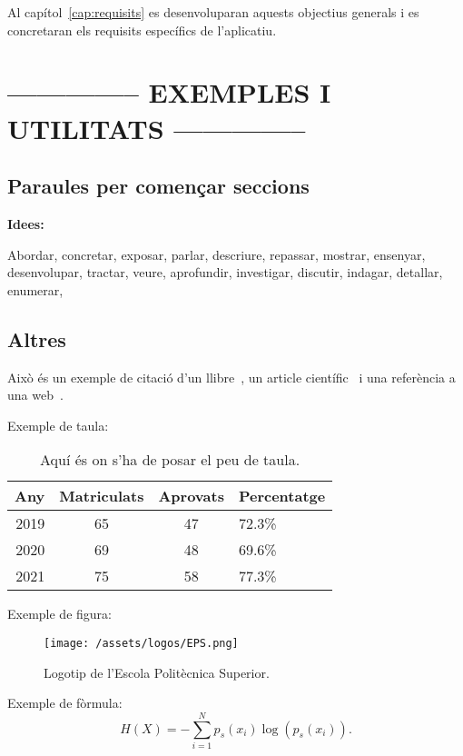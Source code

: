 \documentclass[a4paper,12pt]{ThesisStyle}
\begin{document}
Al capítol~\ref{cap:requisits} es desenvoluparan aquests objectius generals i es concretaran els requisits específics de l'aplicatiu.


\section{-------------- EXEMPLES I UTILITATS --------------}
\subsection{Paraules per començar seccions}
\textbf{Idees:}

Abordar, concretar, exposar, parlar, descriure, repassar, mostrar, ensenyar, desenvolupar, tractar, veure, aprofundir, investigar, discutir, indagar, detallar,
enumerar,


\subsection{Altres}

Això és un exemple de citació d'un llibre~\cite{Coleman1974}, un article científic~\cite{Ruiz2008} i una referència a una web~\cite{Halcon}.

Exemple de taula:
\begin{table}[htb]
\centering
\begin{tabular}{ | r | c | c | l | }
 \hline
  Any & Matriculats & Aprovats & Percentatge\\
\hline
 2019  & 65 & 47 & 72.3\%\\
 2020  & 69 & 48 & 69.6\%\\
 2021  & 75 & 58 & 77.3\%\\
  \hline
  \end{tabular}
\caption{\label{taula:taulaexemple} Aquí és on s'ha de posar el peu de taula. }
\end{table}

Exemple de figura:
\begin{figure}[htb]
\centering
\texttt{[image: /assets/logos/EPS.png]}
\caption{\label{fig:logo} Logotip de l'Escola Politècnica Superior.}
\end{figure}

Exemple de fòrmula:
\begin{equation}
H(X) = -\sum_{i=1}^{N}p_s(x_i) \log \left( p_s(x_i) \right).
\label{equ:entropia}
\end{equation}
\end{document}
